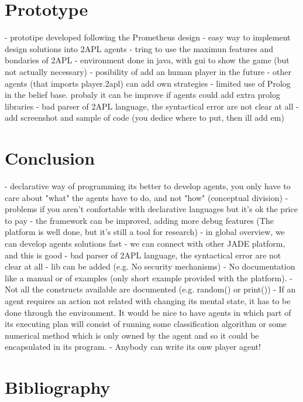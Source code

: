 \documentclass[a4paper]{article}
\begin{document}
\section{Prototype}\label{sec:proto} 

- prototipe developed following the Prometheus design
- easy way to implement design solutions into 2APL agents
- tring to use the maximun features and bondaries of 2APL
- environment done in java, with gui to show the game (but not actually necessary)
- posibility of add an human player in the future
- other agents (that imports player.2apl) can add own strategies
- limited use of Prolog in the belief base. probaly it can be improve if agents could add extra prolog libraries
- bad parser of 2APL language, the syntactical error are not clear at all
- add screenshot and sample of code (you dedice where to put, then ill add em)


\section{Conclusion}\label{sec:concl} 

- declarative way of programming its better to develop agents, you only have to care about "what" the agents have to do, and not "how" (conceptual division)
- problems if you aren't confortable with declarative languages but it's ok the price to pay
- the framework can be improved, adding more debug features (The platform is well done, but it's still a tool for research)
- in global overview, we can develop agents solutions fast
- we can connect with other JADE platform, and this is good
- bad parser of 2APL language, the syntactical error are not clear at all
- lib can be added (e.g. No security mechanisms)
- No documentation like a manual or of examples (only short example provided with the platform). 
- Not all the constructs available are documented (e.g. random() or print())
- If an agent requires an action not related with changing its mental state, it has to be done through the environment. It would be nice to have agents in which part of its executing plan will consist of running some classification algorithm or some numerical method which is only owned by the agent and so it could be encapsulated in its program.
- Anybody can write its onw player agent!

\section{Bibliography}
\nocite{*}


\end{document}

